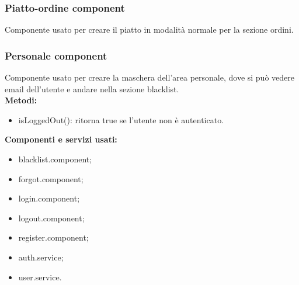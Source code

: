 
\subsubsection{Piatto-ordine component}
Componente usato per creare il piatto in modalità normale per la sezione ordini.\\

\subsubsection{Personale component}
Componente usato per creare la maschera dell'area personale, dove si può vedere email dell'utente e andare nella sezione blacklist.\\
\textbf{Metodi:}
\begin{itemize}
    \item isLoggedOut(): ritorna true se l'utente non è autenticato.
\end{itemize}
\textbf{Componenti e servizi usati:}
\begin{itemize}
    \item blacklist.component;
    \item forgot.component;
    \item login.component;
    \item logout.component;
    \item register.component;
    \item auth.service;
    \item user.service.
\end{itemize}

